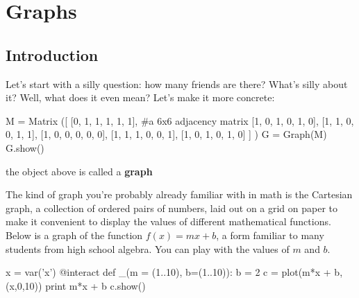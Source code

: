 \chapter{Graphs}

\section{Introduction}

Let's start with a silly question:  how many friends are there?
What's silly about it?  Well, what does it even mean?  Let's make it
more concrete:


\begin{sageverbatim}
M = Matrix ([ [0, 1, 1, 1, 1, 1],   #a 6x6 adjacency matrix
              [1, 0, 1, 0, 1, 0], 
              [1, 1, 0, 0, 1, 1],
              [1, 0, 0, 0, 0, 0],
              [1, 1, 1, 0, 0, 1],
              [1, 0, 1, 0, 1, 0] ] )
G = Graph(M)
G.show()
\end{sageverbatim}

the object above is called a \textbf{graph}

The kind of graph you're probably already familiar with in math is the
Cartesian graph, a collection of ordered pairs of numbers, laid out on
a grid on paper to make it convenient to display the values of
different mathematical functions.  Below is a graph of the function
$f(x) = mx + b$, a form familiar to many students from high school
algebra.  You can play with the values of $m$ and $b$.

\begin{sageverbatim}
x = var('x')
@interact
def _(m = (1..10), b=(1..10)):
    b = 2
    c = plot(m*x + b,(x,0,10))
    print m*x + b
    c.show()
\end{sageverbatim}












